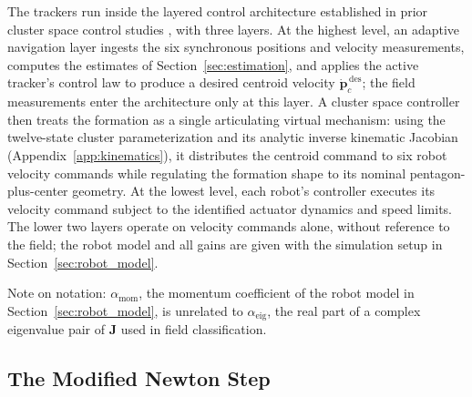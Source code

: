 \documentclass[lettersize,journal]{IEEEtran}
\begin{document}
The trackers run inside the layered control architecture established in
prior cluster space control studies \cite{14,30}, with three layers. At
the highest level, an adaptive navigation layer ingests the six
synchronous positions and velocity measurements, computes the estimates
of Section~\ref{sec:estimation}, and applies the active tracker's
control law to produce a desired centroid velocity
$\dot{\mathbf{p}}_c^{\,\text{des}}$; the field measurements enter the
architecture only at this layer. A cluster space controller then treats
the formation as a single articulating virtual mechanism: using the
twelve-state cluster parameterization and its analytic inverse
kinematic Jacobian (Appendix~\ref{app:kinematics}), it distributes the
centroid command to six robot velocity commands while regulating the
formation shape to its nominal pentagon-plus-center geometry. At the
lowest level, each robot's controller executes its velocity command
subject to the identified actuator dynamics and speed limits. The lower
two layers operate on velocity commands alone, without reference to the
field; the robot model and all gains are given with the simulation
setup in Section~\ref{sec:robot_model}.

Note on notation: $\alpha_{\text{mom}}$, the momentum coefficient of
the robot model in Section~\ref{sec:robot_model}, is unrelated to
$\alpha_{\text{eig}}$, the real part of a complex eigenvalue pair of
$\mathbf{J}$ used in field classification.

\subsection{The Modified Newton Step}
\label{sec:mod_newton}
\end{document}
